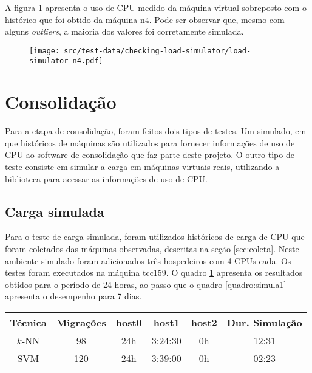 A figura \ref{fig:simworkload} apresenta o uso de CPU medido da máquina virtual
sobreposto com o histórico que foi obtido da máquina n4. Pode-ser observar que,
mesmo com alguns \emph{outliers}, a maioria dos valores foi corretamente
simulada.

\begin{figure}
\centering
\texttt{[image: src/test-data/checking-load-simulator/load-simulator-n4.pdf]}
\label{fig:simworkload}
\end{figure}

\section{Consolidação}

Para a etapa de consolidação, foram feitos dois tipos de testes. Um simulado, em
que históricos de máquinas são utilizados para fornecer informações de uso de
CPU ao software de consolidação que faz parte deste projeto. O outro tipo de
teste consiste em simular a carga em máquinas virtuais reais, utilizando a
biblioteca \libvirt{} para acessar as informações de uso de CPU.

\subsection{Carga simulada}

Para o teste de carga simulada, foram utilizados históricos de carga de CPU que
foram coletados das máquinas observadas, descritas na seção \ref{sec:coleta}.
Neste ambiente simulado foram adicionados três hospedeiros com 4 CPUs cada. Os
testes foram executados na máquina tcc159. O quadro \ref{quadro:simula0}
apresenta os resultados obtidos para o período de 24 horas, ao passo que o
quadro \ref{quadro:simula1} apresenta o desempenho para 7 dias.

\begin{table}[htp]
\centering
\hspace{-2cm} %
\label{quadro:simula0}
\begin{tabular}{| c | c | c | c | c | c |}
\hline
Técnica & Migrações & host0  & host1   & host2 & Dur. Simulação \\
\hline
$k$-NN 	& 98        & 24h    & 3:24:30 & 0h    & 12:31  \\
\hline
SVM 	& 120       & 24h    & 3:39:00 & 0h    & 02:23  \\
\hline
\end{tabular}
\end{table}

